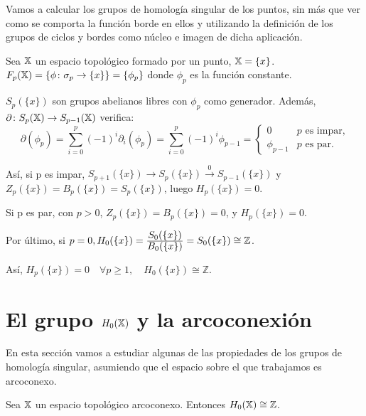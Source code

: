 Vamos a calcular los grupos de homología singular de los puntos, sin más que ver como se comporta la función borde
en ellos y utilizando la definición de los grupos de ciclos y bordes como núcleo e imagen de dicha aplicación.

Sea ${\mathbb X}$ un espacio topológico formado por un punto, ${\mathbb X} = \{x\}$.
$F_{p}({\mathbb X}) = \{ \phi \colon \sigma_p \to \{x\} \} = \{\phi_p\}$ donde $\phi_p$ es la función constante.

$S_p({\{x\}})$ son grupos abelianos libres con $\phi_p$ como generador. Además, $\partial \colon S_{p}({\mathbb X}) \to S_{p-1}({\mathbb X})$ verifica:
\[\partial(\phi_p) = \sum_{i = 0}^p (-1)^i \partial_i(\phi_p) =  \sum_{i = 0}^p (-1)^i \phi_{p-1} = \begin{cases}
                                                                                                            0 & p \text{ es impar,} \\
                                                                                                            \phi_{p-1} & p \text{ es par.}
                                                                                                    \end{cases}   \]

Así, si p es impar, $S_{p+1}(\{x\}) \to S_p(\{x\}) \xrightarrow{0} S_{p-1}(\{x\})$ y $Z_p(\{x\}) = B_p(\{x\}) = S_p(\{x\})$, luego
$H_p(\{x\}) = 0$.

Si p es par, con $p > 0$, $Z_p(\{x\}) = B_p(\{x\}) = 0$, y $H_p(\{x\}) = 0$.

Por último, si $ p = 0, H_0(\{x\}) = \frac{\displaystyle S_0(\{x\})}{\displaystyle B_0(\{x\})} = S_0(\{x\}) \cong \mathbb Z$.

Así, $H_p(\{x\}) = 0 \hspace{1em} \forall p \geq 1, \hspace{1em} H_0(\{x\}) \cong \mathbb Z$.

\section{El grupo $H_0({\mathbb X})$ y la arcoconexión}

En esta sección vamos a estudiar algunas de las propiedades de los grupos de homología singular, asumiendo que el espacio
sobre el que trabajamos es arcoconexo.

\begin{proposition}
  Sea ${\mathbb X}$ un espacio topológico arcoconexo. Entonces $H_0({\mathbb X}) \cong \mathbb Z$.
\end{proposition}

